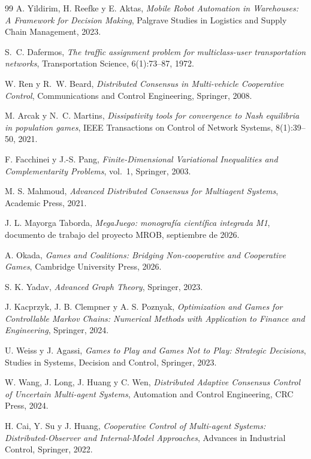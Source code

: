 \documentclass[11pt,a4paper]{article}
\theoremstyle{plain}
\theoremstyle{definition}
\theoremstyle{remark}
\begin{document}
\begin{thebibliography}{99}
A. Yildirim, H. Reefke y E. Aktas,
\emph{Mobile Robot Automation in Warehouses: A Framework for Decision Making},
Palgrave Studies in Logistics and Supply Chain Management, 2023.

S.~C. Dafermos,
\emph{The traffic assignment problem for multiclass-user transportation
networks},
Transportation Science, 6(1):73--87, 1972.

W. Ren y R.~W. Beard,
\emph{Distributed Consensus in Multi-vehicle Cooperative Control},
Communications and Control Engineering, Springer, 2008.

M. Arcak y N.~C. Martins,
\emph{Dissipativity tools for convergence to Nash equilibria in population
games},
IEEE Transactions on Control of Network Systems, 8(1):39--50, 2021.

F. Facchinei y J.-S. Pang,
\emph{Finite-Dimensional Variational Inequalities and Complementarity
Problems}, vol.~1, Springer, 2003.

M. S. Mahmoud,
\emph{Advanced Distributed Consensus for Multiagent Systems},
Academic Press, 2021.

J. L. Mayorga Taborda,
\emph{MegaJuego: monografía científica integrada M1},
documento de trabajo del proyecto MROB, septiembre de 2026.

A. Okada,
\emph{Games and Coalitions: Bridging Non-cooperative and Cooperative Games},
Cambridge University Press, 2026.

S. K. Yadav,
\emph{Advanced Graph Theory},
Springer, 2023.

J. Kacprzyk, J. B. Clempner y A. S. Poznyak,
\emph{Optimization and Games for Controllable Markov Chains: Numerical Methods
with Application to Finance and Engineering},
Springer, 2024.

U. Weiss y J. Agassi,
\emph{Games to Play and Games Not to Play: Strategic Decisions},
Studies in Systems, Decision and Control, Springer, 2023.

W. Wang, J. Long, J. Huang y C. Wen,
\emph{Distributed Adaptive Consensus Control of Uncertain Multi-agent Systems},
Automation and Control Engineering, CRC Press, 2024.

H. Cai, Y. Su y J. Huang,
\emph{Cooperative Control of Multi-agent Systems: Distributed-Observer
and Internal-Model Approaches},
Advances in Industrial Control, Springer, 2022.


\end{thebibliography}
\end{document}
